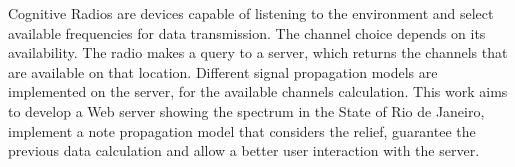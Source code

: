 \begin{foreignabstract}

Cognitive Radios are devices capable of listening to the environment and select available frequencies for data transmission. The channel choice depends on its availability. The radio makes a query to a server, which returns the channels that are available on that location. Different signal propagation models are implemented on the server, for the available channels calculation. This work aims to develop a Web server showing the spectrum in the State of Rio de Janeiro, implement a note propagation model that considers the relief, guarantee the previous data calculation and allow a better user interaction with the server.

\end{foreignabstract}

